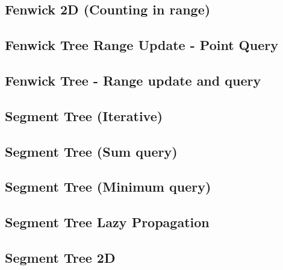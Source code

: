 \documentclass[10pt]{article}
\begin{document}
\begin{multicols*}{2}
\subsection{Fenwick 2D (Counting in range)}


\subsection{Fenwick Tree Range Update - Point Query}


\subsection{Fenwick Tree - Range update and query}


\subsection{Segment Tree (Iterative)}


\subsection{Segment Tree (Sum query)}


\subsection{Segment Tree (Minimum query)}


\subsection{Segment Tree Lazy Propagation}


\subsection{Segment Tree 2D}



\end{multicols*}
\end{document}
